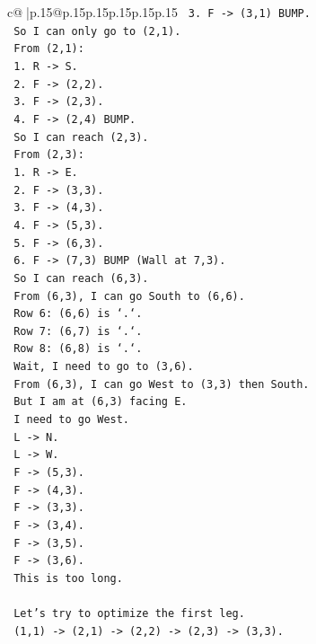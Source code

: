 \documentclass{article}
\begin{document}
{\begin{supertabular}{c@{$\;$}|p{.15\linewidth}@{}p{.15\linewidth}p{.15\linewidth}p{.15\linewidth}p{.15\linewidth}p{.15\linewidth}}
{{{\texttt{   3. F {-}> (3,1) BUMP.} \\
\texttt{   So I can only go to (2,1).} \\
\texttt{   From (2,1):} \\
\texttt{   1. R {-}> S.} \\
\texttt{   2. F {-}> (2,2).} \\
\texttt{   3. F {-}> (2,3).} \\
\texttt{   4. F {-}> (2,4) BUMP.} \\
\texttt{   So I can reach (2,3).} \\
\texttt{   From (2,3):} \\
\texttt{   1. R {-}> E.} \\
\texttt{   2. F {-}> (3,3).} \\
\texttt{   3. F {-}> (4,3).} \\
\texttt{   4. F {-}> (5,3).} \\
\texttt{   5. F {-}> (6,3).} \\
\texttt{   6. F {-}> (7,3) BUMP (Wall at 7,3).} \\
\texttt{   So I can reach (6,3).} \\
\texttt{   From (6,3), I can go South to (6,6).} \\
\texttt{   Row 6: (6,6) is `.`.} \\
\texttt{   Row 7: (6,7) is `.`.} \\
\texttt{   Row 8: (6,8) is `.`.} \\
\texttt{   Wait, I need to go to (3,6).} \\
\texttt{   From (6,3), I can go West to (3,3) then South.} \\
\texttt{   But I am at (6,3) facing E.} \\
\texttt{   I need to go West.} \\
\texttt{   L {-}> N.} \\
\texttt{   L {-}> W.} \\
\texttt{   F {-}> (5,3).} \\
\texttt{   F {-}> (4,3).} \\
\texttt{   F {-}> (3,3).} \\
\texttt{   F {-}> (3,4).} \\
\texttt{   F {-}> (3,5).} \\
\texttt{   F {-}> (3,6).} \\
\texttt{   This is too long.} \\
\\ 
\texttt{   Let's try to optimize the first leg.} \\
\texttt{   (1,1) {-}> (2,1) {-}> (2,2) {-}> (2,3) {-}> (3,3).} \\
}}}
\end{supertabular}}
\end{document}

